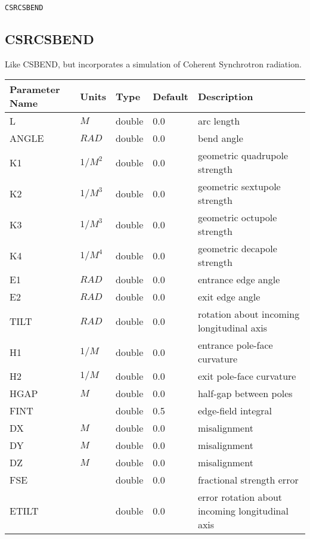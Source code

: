 \begin{latexonly}
\newpage
\begin{center}{\Large\verb|CSRCSBEND|}\end{center}
\end{latexonly}\subsection{CSRCSBEND}
Like CSBEND, but incorporates a simulation of Coherent Synchrotron radiation.
\\
\begin{tabular}{|l|l|l|l|p{\descwidth}|} \hline
Parameter Name & Units & Type & Default & Description \\ \hline 
L & $M$ & double &  0.0 & arc length  \\ \hline 
ANGLE & $RAD$ & double &  0.0 & bend angle  \\ \hline 
K1 & $1/M^{2}$ & double &  0.0 & geometric quadrupole strength  \\ \hline 
K2 & $1/M^{3}$ & double &  0.0 & geometric sextupole strength  \\ \hline 
K3 & $1/M^{3}$ & double &  0.0 & geometric octupole strength  \\ \hline 
K4 & $1/M^{4}$ & double &  0.0 & geometric decapole strength  \\ \hline 
E1 & $RAD$ & double &  0.0 & entrance edge angle  \\ \hline 
E2 & $RAD$ & double &  0.0 & exit edge angle  \\ \hline 
TILT & $RAD$ & double &  0.0 & rotation about incoming longitudinal axis  \\ \hline 
H1 & $1/M$ & double &  0.0 & entrance pole-face curvature  \\ \hline 
H2 & $1/M$ & double &  0.0 & exit pole-face curvature  \\ \hline 
HGAP & $M$ & double &  0.0 & half-gap between poles  \\ \hline 
FINT &  & double &   0.5 & edge-field integral  \\ \hline 
DX & $M$ & double &  0.0 & misalignment  \\ \hline 
DY & $M$ & double &  0.0 & misalignment  \\ \hline 
DZ & $M$ & double &  0.0 & misalignment  \\ \hline 
FSE &  & double &  0.0 & fractional strength error  \\ \hline 
ETILT &  & double &  0.0 & error rotation about incoming longitudinal axis  \\ \hline 

\end{tabular}
